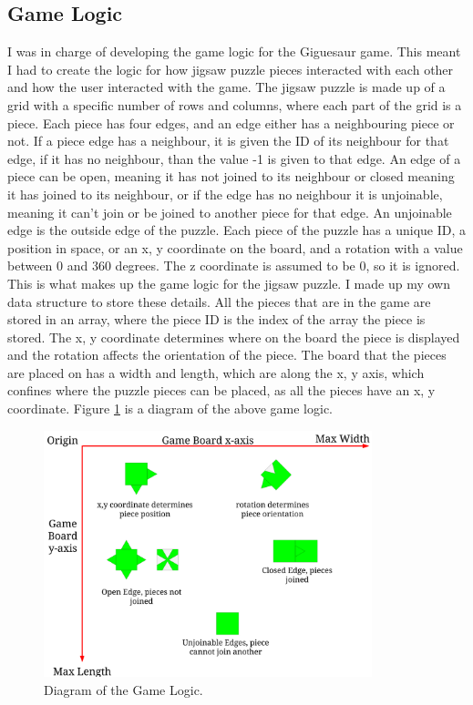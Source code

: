 \documentclass{article}
\begin{document}
\subsection{Game Logic}
I was in charge of developing the game logic for the Giguesaur game. This meant
I had to create the logic for how jigsaw puzzle pieces interacted with each
other and how the user interacted with the game. The jigsaw puzzle is made up of
a grid with a specific number of rows and columns, where each part of the grid
is a piece. Each piece has four edges, and an edge either has a neighbouring
piece or not. If a piece edge has a neighbour, it is given the ID of its
neighbour for that edge, if it has no neighbour, than the value -1 is given to
that edge. An edge of a piece can be open, meaning it has not joined to its
neighbour or closed meaning it has joined to its neighbour, or if the edge has
no neighbour it is unjoinable, meaning it can't join or be joined to another
piece for that edge. An unjoinable edge is the outside edge of the puzzle. Each
piece of the puzzle has a unique ID, a position in space, or an x, y coordinate
on the board, and a rotation with a value between 0 and 360 degrees. The z
coordinate is assumed to be 0, so it is ignored. This is what makes up the game
logic for the jigsaw puzzle. I made up my own data structure to store these
details. All the pieces that are in the game are stored in an array, where the
piece ID is the index of the array the piece is stored. The x, y coordinate
determines where on the board the piece is displayed and the rotation affects
the orientation of the piece. The board that the pieces are placed on has a
width and length, which are along the x, y axis, which confines where the puzzle
pieces can be placed, as all the pieces have an x, y coordinate. Figure
\ref{fig:GameLogic} is a diagram of the above game logic.

\begin{figure}[ht]
\begin{center}
\includegraphics[width=0.85\textwidth, center]{images/GameLogicImage}
\caption{Diagram of the Game Logic.}
\label{fig:GameLogic}
\end{center}
\end{figure}
\end{document}
